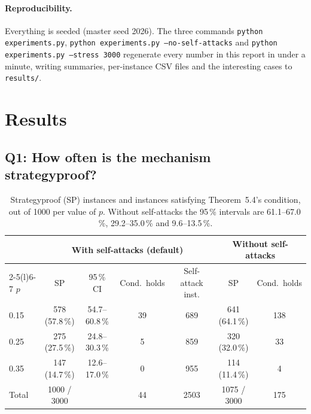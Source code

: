 \documentclass[11pt,a4paper]{article}
\newcommand{\code}[1]{{\let\origus\_\renewcommand{\_}{\origus\allowbreak}\texttt{#1}}}
\theoremstyle{definition}
\begin{document}
\paragraph{Reproducibility.} Everything is seeded (master seed 2026). The three commands
\code{python experiments.py}, \code{python experiments.py --no-self-attacks} and
\code{python experiments.py --stress 3000} regenerate every number in this report in under a minute,
writing summaries, per-instance CSV files and the interesting cases to \code{results/}.

\section{Results}\label{sec:results}

\subsection*{Q1: How often is the mechanism strategyproof?}

\begin{table}[H]
\centering\small
\begin{tabular}{@{}l c c c c c c@{}}
\toprule
& \multicolumn{4}{c}{With self-attacks (default)} & \multicolumn{2}{c}{Without self-attacks} \\
\cmidrule(lr){2-5}\cmidrule(l){6-7}
$p$ & SP & 95\,\% CI & Cond.\ holds & Self-attack inst. & SP & Cond.\ holds \\
\midrule
0.15 & 578 (57.8\,\%) & 54.7--60.8\,\% & 39 & 689 & 641 (64.1\,\%) & 138 \\
0.25 & 275 (27.5\,\%) & 24.8--30.3\,\% & 5  & 859 & 320 (32.0\,\%) & 33 \\
0.35 & 147 (14.7\,\%) & 12.6--17.0\,\% & 0  & 955 & 114 (11.4\,\%) & 4 \\
\midrule
Total & 1000 / 3000 & & 44 & 2503 & 1075 / 3000 & 175 \\
\bottomrule
\end{tabular}
\caption{Strategyproof (SP) instances and instances satisfying Theorem~5.4's condition, out of 1000
per value of $p$. Without self-attacks the 95\,\% intervals are 61.1--67.0\,\%, 29.2--35.0\,\% and
9.6--13.5\,\%.}\label{tab:q1}
\end{table}
\end{document}
